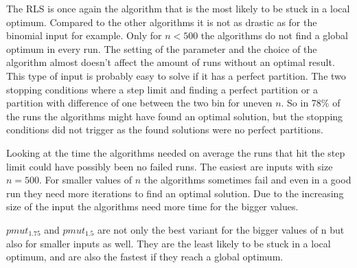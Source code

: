 

The RLS is once again the algorithm that is the most likely to be stuck in a local optimum.
Compared to the other algorithms it is not as drastic as for the binomial input for example.
Only for $n<500$ the algorithms do not find a global optimum in every run.
The setting of the parameter and the choice of the algorithm almost doesn't affect the amount of runs without an optimal result.
This type of input is probably easy to solve if it has a perfect partition.
The two stopping conditions where a step limit and finding a perfect partition or a partition with difference of one between the two bin for uneven $n$.
So in 78\% of the runs the algorithms might have found an optimal solution, but the stopping conditions did not trigger as the found solutions were no perfect partitions.



Looking at the time the algorithms needed on average the runs that hit the step limit could have possibly been no failed runs.
The easiest are inputs with size $n=500$.
For smaller values of $n$ the algorithms sometimes fail and even in a good run they need more iterations to find an optimal solution.
Due to the increasing size of the input the algorithms need more time for the bigger values.



$pmut_{1.75}$ and $pmut_{1.5}$ are not only the best variant for the bigger values of n but also for smaller inputs as well.
They are the least likely to be stuck in a local optimum, and are  also the fastest if they reach a global optimum.
